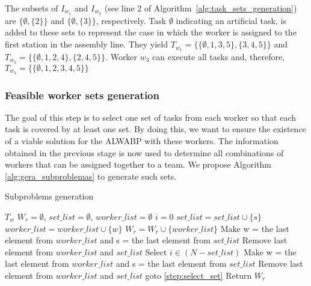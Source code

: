 \documentclass{singlecol-new}
\begin{document}
The subsets of $I_{w_1}$ and $I_{w_2}$ (see line 2 of Algorithm~\ref{alg:task_sets_generation})  are $\{\emptyset, \{2\}\}$ and $\{\emptyset, \{3\}\}$, respectively. Task $\emptyset$ indicating an artificial task, is added to these sets to represent the case in which the worker is assigned to the first station in the assembly line. They yield $T_{w_1} = \{\{\emptyset,1,3,5\},\{3,4,5\}\}$ and  $T_{w_2} = \{\{\emptyset,1,2,4\},\{2,4,5\}\}$. Worker $w_3$ can execute all tasks and, therefore, $T_{w_3} = \{\{\emptyset,1,2,3,4,5\}\}$

\subsubsection{Feasible worker sets generation}

The goal of this step is to select one set of tasks from each worker so that each task is covered by at least one set. By doing this, we want to ensure the existence of a viable solution for the ALWABP with these workers. The information obtained in the previous stage is now used to determine all combinations of workers that can be assigned together to a team. We propose Algorithm \ref{alg:gera_subproblemas} to generate such sets.

\begin{algorithm}[!ht]
\caption{Subproblems generation}
\label{alg:gera_subproblemas}
\begin{algorithmic}[1]
\REQUIRE $T_w$
\STATE $W_r = \emptyset$, $set\_list = \emptyset$, $worker\_list = \emptyset$
\STATE $i = 0$\label{step:artificial_task}
	\label{step:select_set}
		\STATE $set\_list = set\_list \cup \{s\}$ \label{step:add_set}
		\STATE $worker\_list = worker\_list \cup \{w\}$ \label{step:add_worker}
			\STATE $W_r = W_r \cup \{worker\_list\}$ \label{step:add_subproblem}
			\STATE Make w = the last element from $worker\_list$ and s = the last element from $set\_list$
			\STATE Remove last element from $worker\_list$ and $set\_list$\label{step:remove_worker}
		\ELSE
			\STATE Select $i \in (N - set\_list)$\label{step:select_task}
		\ENDIF
	\ENDFOR
\ENDFOR
{}
	\STATE Make w = the last element from $worker\_list$ and s = the last element from $set\_list$
	\STATE Remove last element from $worker\_list$ and $set\_list$ \label{step:remove_last}
	\STATE goto \ref{step:select_set}
\ELSE
	\STATE Return $W_r$\label{step:gera_subp_fim}
\ENDIF
\end{algorithmic}
\end{algorithm}
\end{document}
